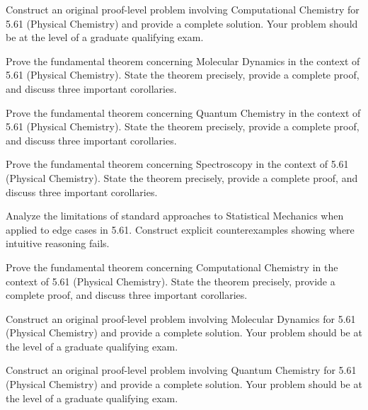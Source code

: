 \documentclass[12pt,a4paper]{exam}
\begin{document}
\begin{questions}
\vspace{0.3cm}

\question[2]
Construct an original proof-level problem involving Computational Chemistry for 5.61 (Physical Chemistry) and provide a complete solution. Your problem should be at the level of a graduate qualifying exam.

\vspace{0.3cm}

\question[4]
Prove the fundamental theorem concerning Molecular Dynamics in the context of 5.61 (Physical Chemistry). State the theorem precisely, provide a complete proof, and discuss three important corollaries.

\vspace{0.3cm}

\question[3]
Prove the fundamental theorem concerning Quantum Chemistry in the context of 5.61 (Physical Chemistry). State the theorem precisely, provide a complete proof, and discuss three important corollaries.

\vspace{0.3cm}

\question[2]
Prove the fundamental theorem concerning Spectroscopy in the context of 5.61 (Physical Chemistry). State the theorem precisely, provide a complete proof, and discuss three important corollaries.

\vspace{0.3cm}

\question[3]
Analyze the limitations of standard approaches to Statistical Mechanics when applied to edge cases in 5.61. Construct explicit counterexamples showing where intuitive reasoning fails.

\vspace{0.3cm}

\question[5]
Prove the fundamental theorem concerning Computational Chemistry in the context of 5.61 (Physical Chemistry). State the theorem precisely, provide a complete proof, and discuss three important corollaries.

\vspace{0.3cm}

\question[6]
Construct an original proof-level problem involving Molecular Dynamics for 5.61 (Physical Chemistry) and provide a complete solution. Your problem should be at the level of a graduate qualifying exam.

\vspace{0.3cm}

\question[2]
Construct an original proof-level problem involving Quantum Chemistry for 5.61 (Physical Chemistry) and provide a complete solution. Your problem should be at the level of a graduate qualifying exam.


\end{questions}
\end{document}
